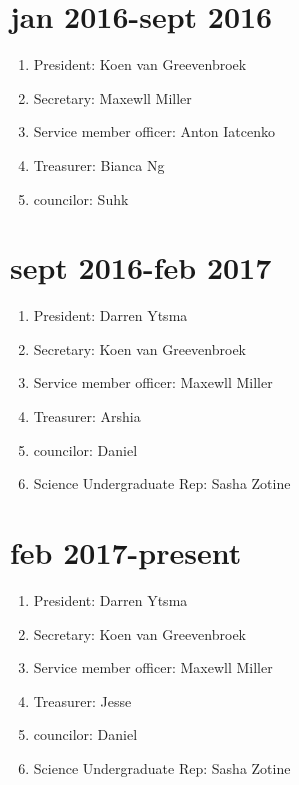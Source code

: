 \documentclass[12pt]{amsart}
\begin{document}
\begin{flushleft}
\section*{jan 2016-sept 2016}

\begin{enumerate}[label=(\alph*)]
\item President: Koen van Greevenbroek
\item Secretary: Maxewll Miller
\item Service member officer: Anton Iatcenko
\item Treasurer: Bianca Ng
\item councilor: Suhk
\end{enumerate}

\section*{sept 2016-feb 2017}

\begin{enumerate}[label=(\alph*)]
\item President: Darren Ytsma
\item Secretary: Koen van Greevenbroek
\item Service member officer: Maxewll Miller
\item Treasurer: Arshia
\item councilor: Daniel
\item Science Undergraduate Rep: Sasha Zotine
\end{enumerate}

\section*{feb 2017-present}

\begin{enumerate}[label=(\alph*)]
\item President: Darren Ytsma
\item Secretary: Koen van Greevenbroek
\item Service member officer: Maxewll Miller
\item Treasurer: Jesse
\item councilor: Daniel
\item Science Undergraduate Rep: Sasha Zotine
\end{enumerate}

\end{flushleft}
\end{document}
